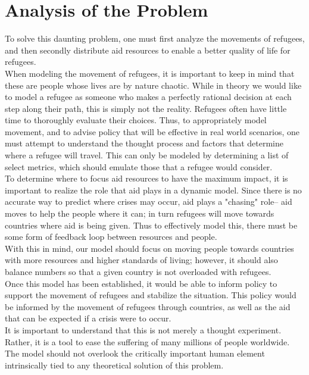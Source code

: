 \documentclass{article}
\begin{document}
\section{Analysis of the Problem}
To solve this daunting problem, one must first analyze the movements of refugees, and then secondly distribute aid resources to enable a better quality of life for refugees.\\
When modeling the movement of refugees, it is important to keep in mind that these are people whose lives are by nature chaotic. While in theory we would like to model a refugee as someone who makes a perfectly rational decision at each step along their path, this is simply not the reality. Refugees often have little time to thoroughly evaluate their choices. Thus, to appropriately model movement, and to advise policy that will be effective in real world scenarios, one must attempt to understand the thought process and factors that determine where a refugee will travel. This can only be modeled by determining a list of select metrics, which should emulate those that a refugee would consider.\\
To determine where to focus aid resources to have the maximum impact, it is important to realize the role that aid plays in a dynamic model. Since there is no accurate way to predict where crises may occur, aid plays a "chasing" role-- aid moves to help the people where it can; in turn refugees will move towards countries where aid is being given. Thus to effectively model this, there must be some form of feedback loop between resources and people.\\
With this in mind, our model should focus on moving people towards countries with more resources and higher standards of living; however, it should also balance numbers so that a given country is not overloaded with refugees.\\
Once this model has been established, it would be able to inform policy to support the movement of refugees and stabilize the situation. This policy would be informed by the movement of refugees through countries, as well as the aid that can be expected if a crisis were to occur. \\
It is important to understand that this is not merely a thought experiment. Rather, it is a tool to ease the suffering of many millions of people worldwide. The model should not overlook the critically important human element intrinsically tied to any theoretical solution of this problem.
\end{document}
